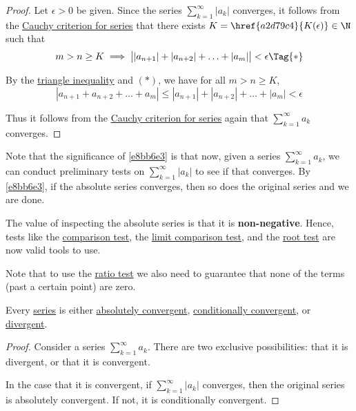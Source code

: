 \begin{proof}
  Let $\epsilon>0$ be given. Since the series $\sum_{k=1}^\infty|a_k|$
  converges, it follows from the \href{ae59546}{Cauchy criterion for series}
  that there exists $K=\href{a2d79c4}{K(\epsilon)}\in\N$ such that
  \begin{equation*}
    {m>n\geq K}\implies\bigl||a_{n+1}|+|a_{n+2}|+\ldots+|a_m|\bigr|<\epsilon\Tag{*}
  \end{equation*}

  By the \href{f1288ad}{triangle inequality} and $(*)$, we have for all
  $m>n\geq K$,
  $$
    |a_{n+1}+a_{n+2}+\ldots+a_m|\leq|a_{n+1}|+|a_{n+2}|+\ldots+|a_m|<\epsilon
  $$

  Thus it follows from the \href{ae59546}{Cauchy criterion for series} again
  that $\sum_{k=1}^\infty a_k$ converges.
\end{proof}

\label{cac931b}

Note that the significance of \autoref{e8bb6e3} is that now, given a series
$\sum_{k=1}^\infty a_k$, we can conduct preliminary tests on
$\sum_{k=1}^\infty|a_k|$ to see if that converges. By \autoref{e8bb6e3}, if the
absolute series converges, then so does the original series and we are done.

The value of inspecting the absolute series is that it is
\textbf{non-negative}. Hence, tests like the \href{d0856d6}{comparison test},
the \href{ea5d3c5}{limit comparison test}, and the \href{d2ba8bd}{root test}
are now valid tools to use.

Note that to use the \href{cb7b15b}{ratio test} we also need to guarantee that
none of the terms (past a certain point) are zero.

\label{d5b50ac}

Every \href{d659804}{series} is either \href{f823d65}{absolutely convergent},
\href{bc12578}{conditionally convergent}, or \href{f8901df}{divergent}.

\begin{proof}
  Consider a series $\sum_{k=1}^\infty a_k$. There are two exclusive
  possibilities: that it is divergent, or that it is convergent.

  In the case that it is convergent, if $\sum_{k=1}^\infty|a_k|$ converges,
  then the original series is absolutely convergent. If not, it is
  conditionally convergent.
\end{proof}

